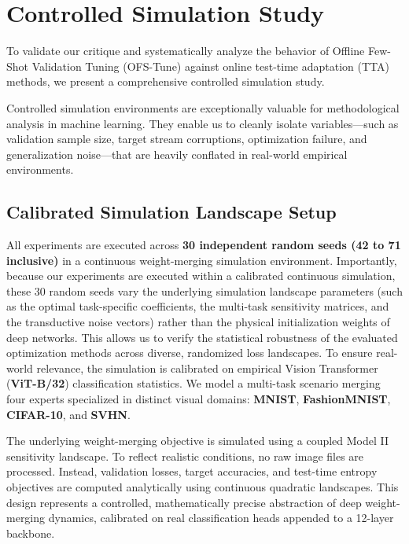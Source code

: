 \section{Controlled Simulation Study}
\label{sec:experiments}

To validate our critique and systematically analyze the behavior of Offline Few-Shot Validation Tuning (OFS-Tune) against online test-time adaptation (TTA) methods, we present a comprehensive controlled simulation study. 

Controlled simulation environments are exceptionally valuable for methodological analysis in machine learning. They enable us to cleanly isolate variables---such as validation sample size, target stream corruptions, optimization failure, and generalization noise---that are heavily conflated in real-world empirical environments.

\subsection{Calibrated Simulation Landscape Setup}
All experiments are executed across \textbf{30 independent random seeds (42 to 71 inclusive)} in a continuous weight-merging simulation environment. Importantly, because our experiments are executed within a calibrated continuous simulation, these 30 random seeds vary the underlying simulation landscape parameters (such as the optimal task-specific coefficients, the multi-task sensitivity matrices, and the transductive noise vectors) rather than the physical initialization weights of deep networks. This allows us to verify the statistical robustness of the evaluated optimization methods across diverse, randomized loss landscapes. To ensure real-world relevance, the simulation is calibrated on empirical Vision Transformer (\textbf{ViT-B/32}) classification statistics. We model a multi-task scenario merging four experts specialized in distinct visual domains: \textbf{MNIST}, \textbf{FashionMNIST}, \textbf{CIFAR-10}, and \textbf{SVHN}. 

The underlying weight-merging objective is simulated using a coupled Model II sensitivity landscape. To reflect realistic conditions, no raw image files are processed. Instead, validation losses, target accuracies, and test-time entropy objectives are computed analytically using continuous quadratic landscapes. This design represents a controlled, mathematically precise abstraction of deep weight-merging dynamics, calibrated on real classification heads appended to a 12-layer backbone.

